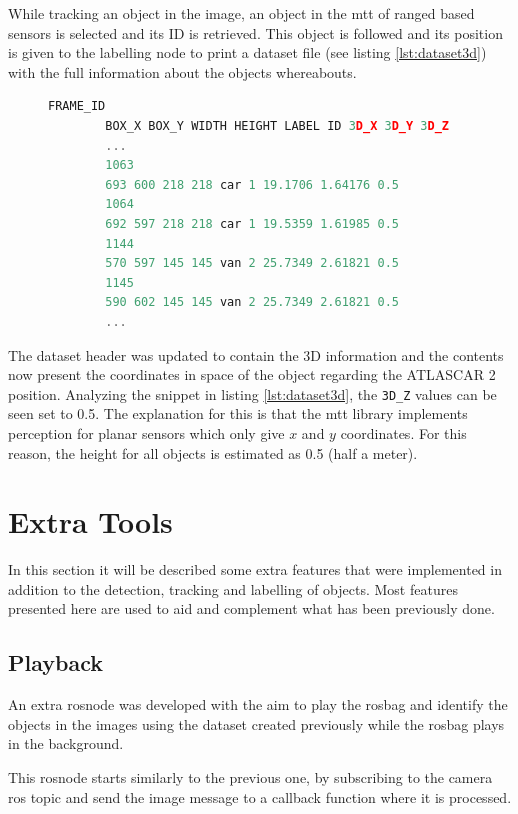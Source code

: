 While tracking an object in the image, an object in the \gls{mtt} of ranged based sensors is selected and its ID is retrieved. This object is followed and its position is given to the labelling node to print a dataset file (see listing \ref{lst:dataset3d}) with the full information about the objects whereabouts.

\begin{figure}
	\begin{center}
		\begin{lstlisting}[label={lst:dataset3d}, caption={Snippet of the dataset with 3D capabilities},language=c++]
		FRAME_ID
		BOX_X BOX_Y WIDTH HEIGHT LABEL ID 3D_X 3D_Y 3D_Z
		...
		1063
		693 600 218 218 car 1 19.1706 1.64176 0.5
		1064
		692 597 218 218 car 1 19.5359 1.61985 0.5
		1144
		570 597 145 145 van 2 25.7349 2.61821 0.5
		1145
		590 602 145 145 van 2 25.7349 2.61821 0.5
		...		\end{lstlisting}
	\end{center}
\end{figure}

The dataset header was updated to contain the 3D information and the contents now present the coordinates in space of the object regarding the ATLASCAR 2 position. Analyzing the snippet in listing \ref{lst:dataset3d}, the \texttt{3D\_Z} values can be seen set to 0.5. The explanation for this is that the \gls{mtt} library implements perception for planar sensors which only give $x$ and $y$ coordinates. For this reason, the height for all objects is estimated as 0.5 (half a meter). 

\section{Extra Tools}

In this section it will be described some extra features that were implemented in addition to the detection, tracking and labelling of objects. Most features presented here are used to aid and complement what has been previously done.

\subsection{Playback}

An extra rosnode was developed with the aim to play the rosbag and identify the objects in the images using the dataset created previously while the rosbag plays in the background.

This rosnode starts similarly to the previous one, by subscribing to the camera \gls{ros} topic and send the image message to a callback function where it is processed. 

